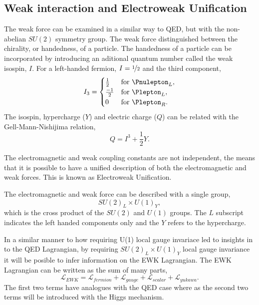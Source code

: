 \subsection{Weak interaction and Electroweak Unification}

The weak force can be examined in a similar way to QED, but with the non-abelian
$SU(2)$ symmetry group. The weak force distinguished between the chirality, or
handedness, of a particle.
The handedness of a particle can be incorporated by introducing an aditional
quantum number called the weak isospin, $I$.
For a left-handed fermion, $I=\nicefrac{1}{2}$ and the third component,
\begin{equation}
I_{3} =
  \begin{cases}
    \frac{1}{2}  & \text{for \Pnulepton}_L,  \\
    \frac{-1}{2} & \text{for \Plepton}_L, \\
    0            & \text{for \Plepton}_R.
  \end{cases}
\end{equation}
The isospin, hypercharge ($Y$) and electric charge ($Q$) can be related with the
Gell-Mann-Nishijima relation,
\begin{equation}
Q = I^{3} + \frac{1}{2}Y.
\end{equation}

The electromagnetic and weak coupling constants are not independent, the means that it is
possible to have a unified description of both the electromagnetic and weak
forces. This is known as Electroweak Unification.

The electromagnetic and weak force can be described with a single group,
\begin{equation}
SU(2)_{L} \times U(1)_{Y},
\end{equation}
which is the cross product of the $SU(2)$ and $U(1)$ groups. The $L$ subscript
indicates the left handed components only and the $Y$ refers to the hypercharge.

In a similar manner to how requiring U(1) local gauge invariace led to insights
in to the QED Lagrangian, by requiring $SU(2)_{L} \times U(1)_{Y}$ local gauge
invariance it will be posible to infer information on the EWK Lagrangian.
The EWK Lagrangian can be written as the sum of many parts,
\begin{equation}
\mathcal{L}_{EWK} = 
\mathcal{L}_{fermion}
+ \mathcal{L}_{gauge}
+ \mathcal{L}_{scalar}
+ \mathcal{L}_{yukawa}.
\end{equation}
The first two terms have analogues with the QED case where as the second two
terms will be introduced with the Higgs mechanism.

